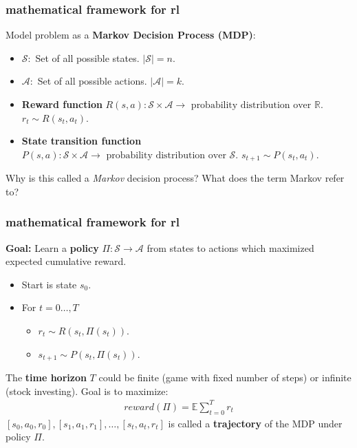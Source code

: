 \documentclass[handout,compress]{beamer}
\newcommand{\R}{\mathbb{R}}
\newcommand{\E}{\mathbb{E}}
\begin{document}
\begin{frame}
	\frametitle{mathematical framework for rl}
	\small
	Model problem as a \textbf{Markov Decision Process (MDP)}:
	\begin{itemize}
		\item $\mathcal{S}:$ Set of all possible states. $|\mathcal{S}| = n$. 
		\item $\mathcal{A}:$ Set of all possible actions. $|\mathcal{A}| = k$. 
		\item \textbf{Reward function} $R(s,a): \mathcal{S}\times \mathcal{A} \rightarrow \text{ probability distribution over $\R$.}$ $r_t \sim R(s_t, a_t)$. 
		\item \textbf{State transition function} $P(s,a): \mathcal{S}\times \mathcal{A} \rightarrow \text{ probability distribution over $\mathcal{S}$.}$ $s_{t+1} \sim P(s_t, a_t)$. 
 	\end{itemize}
\begin{center}
	\alert{Why is this called a \emph{Markov} decision process? What does the term Markov refer to?}
\end{center}
\end{frame}

\begin{frame}
	\frametitle{mathematical framework for rl}
	\textbf{Goal:} Learn a \textbf{policy} $\Pi: \mathcal{S} \rightarrow \mathcal{A}$ from states to actions which maximized expected cumulative reward.
	\begin{itemize}
		\item Start is state $s_0$. 
		\item For $t = 0\ldots, T$
		\begin{itemize}
			\item $r_t \sim R(s_t,\Pi(s_t))$.
			\item $s_{t+1} \sim P(s_t,\Pi(s_t))$.
		\end{itemize}
	\end{itemize}	
The \textbf{time horizon} $T$ could be finite (game with fixed number of steps) or infinite (stock investing). Goal is to maximize:
\begin{align*}
reward(\Pi) = \E \sum_{t = 0}^T r_t
\end{align*}
$[s_0,a_0, r_0], [s_1, a_1, r_1], \ldots, [s_t, a_t, r_t]$ is called a \textbf{trajectory} of the MDP under policy $\Pi$. 
\end{frame}
\end{document}
